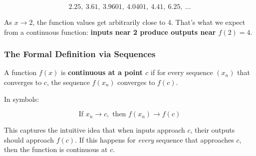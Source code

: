 \[
2.25,\ 3.61,\ 3.9601,\ 4.0401,\ 4.41,\ 6.25,\ \dots
\]

As \( x \to 2 \), the function values get arbitrarily close to 4. That’s what we expect from a continuous function: \textbf{inputs near 2 produce outputs near \( f(2) = 4 \)}.

\subsubsection{The Formal Definition via Sequences}

A function \( f(x) \) is \textbf{continuous at a point \( c \)} if for every sequence \( (x_n) \) that converges to \( c \), the sequence \( f(x_n) \) converges to \( f(c) \).

In symbols:

\[
\text{If } x_n \to c, \text{ then } f(x_n) \to f(c)
\]

This captures the intuitive idea that when inputs approach \( c \), their outputs should approach \( f(c) \). If this happens for \textit{every} sequence that approaches \( c \), then the function is continuous at \( c \).

\begin{center}
\end{center}

